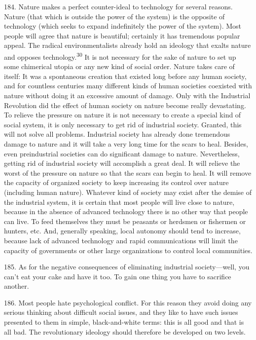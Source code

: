 \documentclass{article}
\begin{document}
184.  Nature makes a perfect counter-ideal to technology for several reasons.  Nature (that which 
is  outside  the  power  of  the  system)  is  the  opposite  of  technology  (which  seeks  to  expand  
indefinitely the power of the system).  Most people will agree that nature is beautiful; certainly it 
has tremendous popular appeal.  The radical environmentalists already hold an ideology that exalts 
nature and opposes technology.\textsuperscript{30} It is not necessary for the sake of nature to set up some chimerical 
utopia or any new kind of social order.  Nature takes care of itself: It was a spontaneous creation 
that existed long before  any human society, and  for countless centuries  many different kinds of 
human societies coexisted with nature without doing it an excessive amount of damage.  Only with 
the Industrial Revolution did the effect of human society on nature become really devastating.  To 
relieve the pressure on nature it is not necessary to create a special kind of social system, it is only 
necessary  to  get  rid  of  industrial  society.   Granted,  this  will  not  solve  all  problems.   Industrial 
society  has  already done tremendous damage to  nature  and it will take  a  very long time for the 
scars to heal.  Besides, even preindustrial societies can do significant damage to 
nature.  Nevertheless, getting rid of industrial society will accomplish a great deal.  It will relieve
the worst of the pressure on nature so that the scars can begin to heal.  It will remove the capacity 
of organized society to keep increasing its control over nature (including human nature).  Whatever 
kind of society may exist after the demise of the industrial system, it is certain that most people 
will live close to nature, because in the absence of advanced technology there is no other way that 
people can live.  To feed themselves they must be peasants or herdsmen or fishermen or hunters, 
etc.  And, generally speaking, local autonomy should tend to increase, because lack of advanced 
technology  and  rapid  communications  will  limit  the  capacity  of  governments  or  other  large  
organizations to control local communities. \vspace{\baselineskip}

185.  As for the negative consequences of eliminating industrial society—well, you can’t eat your 
cake and have it too.  To gain one thing you have to sacrifice another. \vspace{\baselineskip}

186.  Most  people  hate  psychological  conflict.   For  this  reason  they  avoid  doing  any  serious  
thinking about difficult social issues, and they like to have such issues presented to them in simple, 
black-and-white  terms:  this  is  all  good  and  that  is  all  bad.   The  revolutionary  ideology  should  
therefore be developed on two levels. \vspace{\baselineskip}
\end{document}
